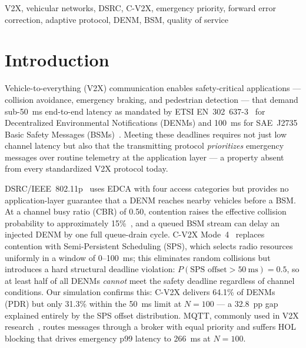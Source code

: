 \documentclass[journal]{IEEEtran}
\begin{document}
\begin{IEEEkeywords}
V2X, vehicular networks, DSRC, C-V2X, emergency priority, forward error
correction, adaptive protocol, DENM, BSM, quality of service
\end{IEEEkeywords}


\section{Introduction}
\label{sec:intro}

Vehicle-to-everything (V2X) communication enables safety-critical
applications — collision avoidance, emergency braking, and pedestrian
detection — that demand sub-\SI{50}{\milli\second} end-to-end latency as
mandated by ETSI EN~302~637-3~\cite{ETSI_EN_302_637_3} for Decentralized
Environmental Notifications (DENMs) and \SI{100}{\milli\second} for SAE~J2735
Basic Safety Messages (BSMs)~\cite{SAE_J2735_2023}.
Meeting these deadlines requires not just low channel latency but also that
the transmitting protocol \emph{prioritizes} emergency messages over routine
telemetry at the application layer — a property absent from every standardized
V2X protocol today.

DSRC/IEEE~802.11p~\cite{IEEE_80211p_2010} uses EDCA with four access
categories but provides no application-layer guarantee that a DENM reaches
nearby vehicles before a BSM.
At a channel busy ratio (CBR) of 0.50, contention raises the effective
collision probability to approximately 15\%~\cite{Sepulcre2011}, and a
queued BSM stream can delay an injected DENM by one full queue-drain cycle.
C-V2X Mode~4~\cite{3GPP_TS_36213} replaces contention with Semi-Persistent
Scheduling (SPS), which selects radio resources uniformly in a window of
0–\SI{100}{\milli\second}; this eliminates random collisions but introduces a
hard structural deadline violation: $P(\text{SPS offset} > \SI{50}{\milli\second})
= 0.5$, so at least half of all DENMs \emph{cannot} meet the safety deadline
regardless of channel conditions.
Our simulation confirms this: C-V2X delivers 64.1\% of DENMs (PDR) but only
31.3\% within the \SI{50}{\milli\second} limit at $N{=}100$ — a 32.8~pp gap
explained entirely by the SPS offset distribution.
MQTT, commonly used in V2X research~\cite{Lyu2021}, routes messages through
a broker with equal priority and suffers HOL blocking that drives emergency
p99 latency to \SI{266}{\milli\second} at $N{=}100$.
\end{document}
